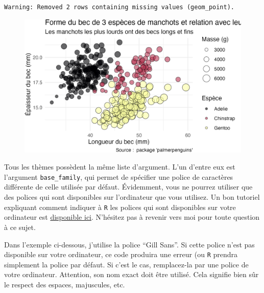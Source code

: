 \documentclass[
  letterpaper,
  DIV=11,
  numbers=noendperiod]{scrreprt}
\begin{document}
\begin{verbatim}
Warning: Removed 2 rows containing missing values (geom_point).
\end{verbatim}

\begin{figure}[H]

{\centering \includegraphics{./03-visualization_files/figure-pdf/unnamed-chunk-110-1.png}

}

\end{figure}

Tous les thèmes possèdent la même liste d'argument. L'un d'entre eux est
l'argument \texttt{base\_family}, qui permet de spécifier une police de
caractères différente de celle utilisée par défaut. Évidemment, vous ne
pourrez utiliser que des polices qui sont disponibles sur l'ordinateur
que vous utilisez. Un bon tutoriel expliquant comment indiquer à
\texttt{R} les polices qui sont disponibles sur votre ordinateur est
\href{https://r-coder.com/custom-fonts-r/}{disponible ici}. N'hésitez
pas à revenir vers moi pour toute question à ce sujet.

Dans l'exemple ci-dessous, j'utilise la police ``Gill Sans''. Si cette
police n'est pas disponible sur votre ordinateur, ce code produira une
erreur (ou \texttt{R} prendra simplement la police par défaut. Si c'est
le cas, remplacez-la par une police de votre ordinateur. Attention, son
nom exact doit être utilisé. Cela signifie bien sûr le respect des
espaces, majuscules, etc.
\end{document}
